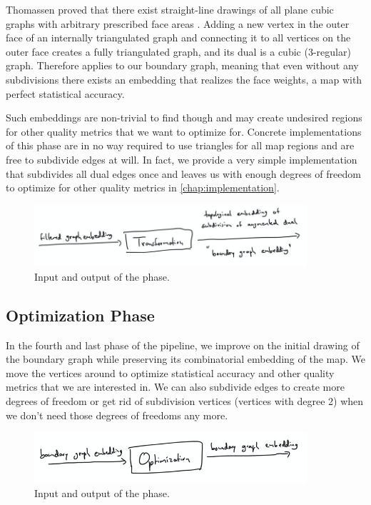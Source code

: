 Thomassen proved that there exist straight-line drawings of all plane cubic graphs with arbitrary prescribed face areas \cite{thomassen1992plane}. Adding a new vertex in the outer face of an internally triangulated graph and connecting it to all vertices on the outer face creates a fully triangulated graph, and its dual is a cubic (3-regular) graph. Therefore \cite{thomassen1992plane} applies to our boundary graph, meaning that even without any subdivisions there exists an embedding that realizes the face weights, \ie{} a map with perfect statistical accuracy.

Such embeddings are non-trivial to find though and may create undesired regions for other quality metrics that we want to optimize for. Concrete implementations of this phase are in no way required to use triangles for all map regions and are free to subdivide edges at will. In fact, we provide a very simple implementation that subdivides all dual edges once and leaves us with enough degrees of freedom to optimize for other quality metrics in \cref{chap:implementation}.

\begin{figure}[H]
	\centering\includegraphics[width=0.9\textwidth]{Resources/Pipeline-Transformation.png}
	\caption{Input and output of the  phase.}
	\label{fig:pipeline-static}
\end{figure}



\subsection{Optimization Phase}

In the fourth and last phase of the pipeline, we improve on the initial drawing of the boundary graph while preserving its combinatorial embedding of the map. We move the vertices around to optimize statistical accuracy and other quality metrics that we are interested in. We can also subdivide edges to create more degrees of freedom or get rid of subdivision vertices (vertices with degree 2) when we don't need those degrees of freedoms any more.

\begin{figure}[H]
	\centering\includegraphics[width=0.9\textwidth]{Resources/Pipeline-Optimization.png}
	\caption{Input and output of the  phase.}
	\label{fig:pipeline-static}
\end{figure}
